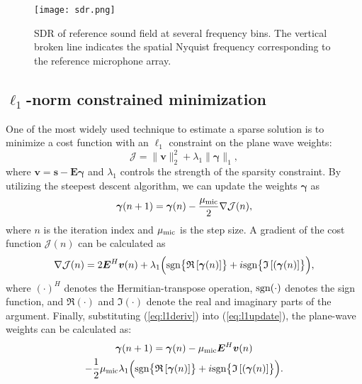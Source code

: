 \documentclass{article}
\begin{document}
%
\begin{figure}[t]
\vspace*{-10pt}
  \centering
  \centerline{\texttt{[image: sdr.png]}}
\vspace{-1pt}
\caption{SDR of reference sound field at several frequency bins. The vertical broken line indicates the spatial Nyquist frequency corresponding to the reference microphone array.}
\label{fig:SDR}
\vspace{-4pt}
\end{figure}
%


\subsection{$\ell_1$-norm constrained minimization}

One of the most widely used technique to estimate a sparse solution
is to minimize a cost function with an $\ell_1$ constraint
on the plane wave weights:
%
\begin{equation}
\mathcal{J} = \| \bm{v} \|^2_2 + \lambda_1 \| \bm{\gamma} \|_1 ,
\label{eq:l1const}
\end{equation}
%
where $\bm{v} = \bm{s} - \bm{E} \bm{\gamma}$ and $\lambda_1$ controls the strength
of the sparsity constraint.
By utilizing the steepest descent algorithm,
we can update the weights $\bm{\gamma}$ as 
%
\begin{equation}
\bm{\gamma}(n+1) = \bm{\gamma}(n) - \frac{\mu_{\rm mic}}{2} \nabla \mathcal{J}(n) ,
\label{eq:l1update}
\end{equation}
%
where $n$ is the iteration index and $\mu_{\rm mic}$ is the step size.
A gradient of the cost function $\mathcal{J}(n)$ can be calculated as~\cite{zhangg2016sparse,zhang2016multichannel}
%
\begin{equation}
\nabla \mathcal{J}(n) = 2 \bm{E}^H \bm{v}(n)
 + \lambda_1 \Bigl( {\rm sgn} \bigl\{ \mathfrak{R}\left[\bm{\gamma}(n)\right] \bigr\}
 + i {\rm sgn} \bigl\{ \mathfrak{I} \left[(\bm{\gamma}(n)\right] \bigr\} \Bigr) ,
\label{eq:l1deriv}
\end{equation}
%
where $(\cdot)^H$ denotes the Hermitian-transpose operation, ${\rm sgn(\cdot)}$ denotes the sign function,
and $\mathfrak{R}(\cdot)$ and $\mathfrak{I}(\cdot)$ denote the real and imaginary parts of the argument.
Finally, substituting (\ref{eq:l1deriv}) into (\ref{eq:l1update}), the plane-wave weights can be calculated as:
%
\begin{multline}
\bm{\gamma}(n+1) = \bm{\gamma}(n) - \mu_{\rm mic} \bm{E}^H \bm{v} (n) \\
 - \frac{1}{2} \mu_{\rm mic} \lambda_1 \Bigl( {\rm sgn} \bigl\{ \mathfrak{R}\left[\bm{\gamma}(n)\right] \bigr\}
 + i {\rm sgn} \bigl\{ \mathfrak{I} \left[(\bm{\gamma}(n)\right] \bigr\} \Bigr) .
\label{eq:l1update2}
\end{multline}
%
\end{document}
